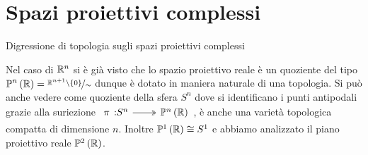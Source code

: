 		\section{Spazi proiettivi complessi}
Digressione di topologia sugli spazi proiettivi complessi
\begin{remember}
	Nel caso di $\mathbb{R}^n$ si è già visto che lo spazio proiettivo reale è un quoziente del tipo $\displaystyle \proj[n]{\realset}=\nicefrac{\realset^{n+1}\setminus\{0\}}{\sim}$ dunque è dotato in maniera naturale di una topologia.\newline
	Si può anche vedere come quoziente della sfera $S^n$ dove si identificano i punti antipodali grazie alla suriezione $\surr \pi {S^n} {\proj[n]{\realset}}$, è anche una varietà topologica compatta di dimensione $n$. Inoltre $\proj[1]{\realset}\cong S^1$ e abbiamo analizzato il piano proiettivo reale $\proj[2]{\realset}$.
\end{remember}


